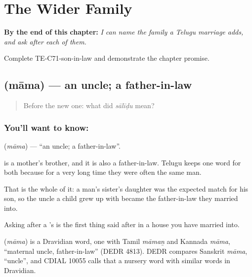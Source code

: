 
\chapter{The Wider Family}
\label{ch:te-the-wider-family}

\begin{chapteropening}
\textbf{By the end of this chapter:} \emph{I can name the family a Telugu marriage adds, and ask after each of them.}

Complete TE-C71-son-in-law and demonstrate the chapter promise.
\end{chapteropening}

\section[\texorpdfstring{\te{మామ} (māma)}{మామ (māma)}]{ (māma) — an uncle; a father-in-law}

\label{lesson:TE-C71-uncle}



\begin{quote}
Before the new one: what did \emph{sālīḍu} mean?
\end{quote}

\subsection*{You'll want to know: }
\textbf{} (\emph{māma}) — \textquotedblleft{}an uncle; a father-in-law\textquotedblright{}.

 is a mother's brother, and it is also a father-in-law. Telugu keeps one word for both because for a very long time they were often the same man.

That is the whole of it: a man's sister's daughter was the expected match for his son, so the uncle a child grew up with became the father-in-law they married into.

Asking after a 's  is the first thing said after  in a house you have married into.

\begin{cousinweb}
\textbf{} (\emph{māma}) is a Dravidian word, one with Tamil \emph{māmaṉ} and Kannada \emph{māma}, \textquotedblleft{}maternal uncle, father-in-law\textquotedblright{} (DEDR 4813). DEDR compares Sanskrit \emph{māma}, \textquotedblleft{}uncle\textquotedblright{}, and CDIAL 10055 calls that a nursery word with similar words in Dravidian.
\end{cousinweb}

